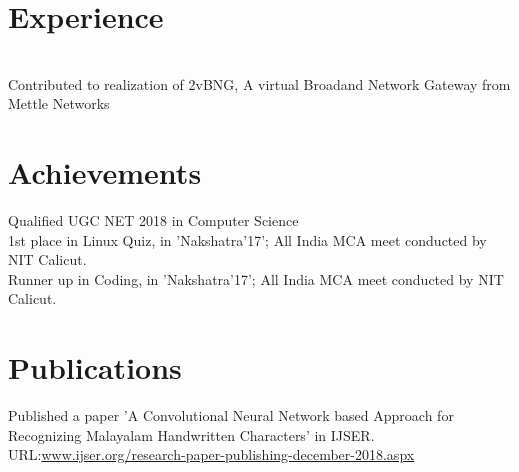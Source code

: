 \documentclass[11pt]{hieudo-build}
\begin{document}
\begin{minipage}[t]{0.34\textwidth}
 \sectionsep
{}
\sectionsep
\end{minipage} 
\hfill
\begin{minipage}[t]{0.63\textwidth} 
\section{Experience}

 \\
 Contributed to realization of 2vBNG, A virtual Broadand Network Gateway from Mettle Networks


 \section{Achievements}
 \textbullet{} Qualified UGC NET 2018 in Computer Science \\
 \textbullet{} 1st place in Linux Quiz,
 in 'Nakshatra'17'; All India  MCA meet conducted by NIT Calicut.\\
 \textbullet{} Runner up in Coding, in 'Nakshatra'17'; All India 
 MCA meet conducted by NIT Calicut. 
 


\section{Publications}
\textbullet{}Published a paper 'A Convolutional Neural Network based Approach for Recognizing Malayalam Handwritten Characters' in IJSER.\\
URL:\href {  https://www.ijser.org/onlineResearchPaperViewer.aspx?A-Convolutional-Neural-Network-based-Approach-for-Recognizing-Malayalam-Handwritten-Characters.pdf}{www.ijser.org/research-paper-publishing-december-2018.aspx}


\end{minipage}
\end{document}
